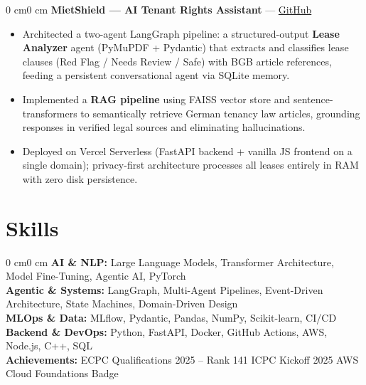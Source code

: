 \documentclass[10pt, letterpaper]{article}
\newenvironment{highlights}{\begin{itemize}[topsep=0.05 cm, parsep=0.05 cm, partopsep=0pt, itemsep=0pt, leftmargin=10pt]}{\end{itemize}}
\newenvironment{onecolentry}{\begin{adjustwidth}{0 cm}{0 cm}}{\end{adjustwidth}}
\begin{document}
\vspace{0.05cm}

\begin{onecolentry}
\textbf{MietShield --- AI Tenant Rights Assistant} --- \href{https://github.com/ZiadXI/MietShield}{GitHub}
\begin{highlights}
\item Architected a two-agent LangGraph pipeline: a structured-output \textbf{Lease Analyzer} agent (PyMuPDF + Pydantic) that extracts and classifies lease clauses (Red Flag / Needs Review / Safe) with BGB article references, feeding a persistent conversational agent via SQLite memory.
\item Implemented a \textbf{RAG pipeline} using FAISS vector store and sentence-transformers to semantically retrieve German tenancy law articles, grounding responses in verified legal sources and eliminating hallucinations.
\item Deployed on Vercel Serverless (FastAPI backend + vanilla JS frontend on a single domain); privacy-first architecture processes all leases entirely in RAM with zero disk persistence.
\end{highlights}
\end{onecolentry}

\section{Skills}
\begin{onecolentry}
\textbf{AI \& NLP:} Large Language Models, Transformer Architecture, Model Fine-Tuning, Agentic AI, PyTorch \\
\textbf{Agentic \& Systems:} LangGraph, Multi-Agent Pipelines, Event-Driven Architecture, State Machines, Domain-Driven Design \\
\textbf{MLOps \& Data:} MLflow, Pydantic, Pandas, NumPy, Scikit-learn, CI/CD \\
\textbf{Backend \& DevOps:} Python, FastAPI, Docker, GitHub Actions, AWS, Node.js, C++, SQL \\
\textbf{Achievements:} ECPC Qualifications 2025 -- Rank 141 \quad\textbullet\quad ICPC Kickoff 2025 \quad\textbullet\quad AWS Cloud Foundations Badge
\end{onecolentry}
\end{document}
